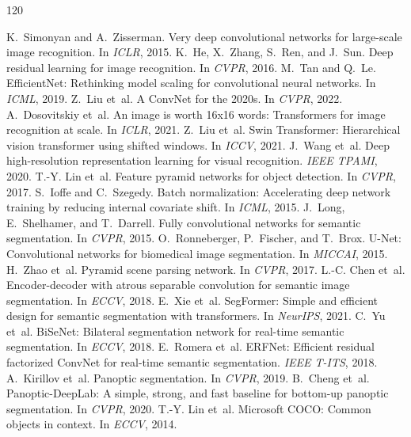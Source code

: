 \documentclass[10pt,twocolumn]{article}
\begin{document}

\begin{thebibliography}{120}\footnotesize

 K.~Simonyan and A.~Zisserman. Very deep convolutional networks for large-scale image recognition. In \emph{ICLR}, 2015.
 K.~He, X.~Zhang, S.~Ren, and J.~Sun. Deep residual learning for image recognition. In \emph{CVPR}, 2016.
 M.~Tan and Q.~Le. EfficientNet: Rethinking model scaling for convolutional neural networks. In \emph{ICML}, 2019.
 Z.~Liu et~al. A ConvNet for the 2020s. In \emph{CVPR}, 2022.
 A.~Dosovitskiy et~al. An image is worth 16x16 words: Transformers for image recognition at scale. In \emph{ICLR}, 2021.
 Z.~Liu et~al. Swin Transformer: Hierarchical vision transformer using shifted windows. In \emph{ICCV}, 2021.
 J.~Wang et~al. Deep high-resolution representation learning for visual recognition. \emph{IEEE TPAMI}, 2020.
 T.-Y. Lin et~al. Feature pyramid networks for object detection. In \emph{CVPR}, 2017.
 S.~Ioffe and C.~Szegedy. Batch normalization: Accelerating deep network training by reducing internal covariate shift. In \emph{ICML}, 2015.
 J.~Long, E.~Shelhamer, and T.~Darrell. Fully convolutional networks for semantic segmentation. In \emph{CVPR}, 2015.
 O.~Ronneberger, P.~Fischer, and T.~Brox. U-Net: Convolutional networks for biomedical image segmentation. In \emph{MICCAI}, 2015.
 H.~Zhao et~al. Pyramid scene parsing network. In \emph{CVPR}, 2017.
 L.-C. Chen et~al. Encoder-decoder with atrous separable convolution for semantic image segmentation. In \emph{ECCV}, 2018.
 E.~Xie et~al. SegFormer: Simple and efficient design for semantic segmentation with transformers. In \emph{NeurIPS}, 2021.
 C.~Yu et~al. BiSeNet: Bilateral segmentation network for real-time semantic segmentation. In \emph{ECCV}, 2018.
 E.~Romera et~al. ERFNet: Efficient residual factorized ConvNet for real-time semantic segmentation. \emph{IEEE T-ITS}, 2018.
 A.~Kirillov et~al. Panoptic segmentation. In \emph{CVPR}, 2019.
 B.~Cheng et~al. Panoptic-DeepLab: A simple, strong, and fast baseline for bottom-up panoptic segmentation. In \emph{CVPR}, 2020.
 T.-Y. Lin et~al. Microsoft COCO: Common objects in context. In \emph{ECCV}, 2014.

\end{thebibliography}
\end{document}
